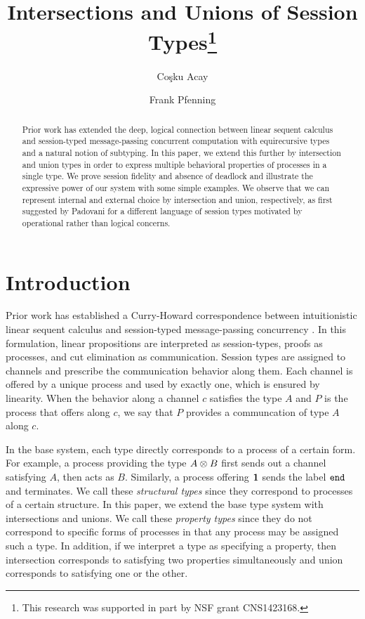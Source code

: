 \documentclass[a4paper,USenglish]{lipics-v2016}
\title{Intersections and Unions of Session Types\footnote{This research was supported in part by NSF grant CNS1423168.}}
\author[1]{Co\c{s}ku Acay}
\author[2]{Frank Pfenning}
\affil[1]{Carnegie Mellon University, Pittsburgh, PA 15213 \\
  \texttt{cacay@cmu.edu}}
\affil[2]{Carnegie Mellon University, Pittsburgh, PA 15213 \\
  \texttt{fp@cs.cmu.edu}}
\begin{document}
\maketitle

\begin{abstract}
  Prior work has extended the deep, logical connection between linear
  sequent calculus and session-typed message-passing concurrent
  computation with equirecursive types and a natural notion of
  subtyping. In this paper, we extend this further by intersection and
  union types in order to express multiple behavioral properties of
  processes in a single type. We prove session fidelity and absence of
  deadlock and illustrate the expressive power of our system with some
  simple examples. We observe that we can represent internal and
  external choice by intersection and union, respectively, as first
  suggested by Padovani for a different language of session types
  motivated by operational rather than logical concerns.
\end{abstract}


\section{Introduction}

Prior work has established a Curry-Howard correspondence between intuitionistic linear sequent calculus and session-typed message-passing concurrency \cite{CairesP10, PfenningG15, Honda93}. In this formulation, linear propositions are interpreted as session-types, proofs as processes, and cut elimination as communication. Session types are assigned to channels and prescribe the communication behavior along them. Each channel is offered by a unique process and used by exactly one, which is ensured by linearity. When the behavior along a channel $c$ satisfies the type $A$ and $P$ is the process that offers along $c$, we say that $P$ provides a communcation of type $A$ along $c$.

In the base system, each type directly corresponds to a process of a certain form. For example, a process providing the type $A \otimes B$ first sends out a channel satisfying $A$, then acts as $B$. Similarly, a process offering $\mathbf{1}$ sends the label $\texttt{end}$ and terminates. We call these \emph{structural types} since they correspond to processes of a certain structure. In this paper, we extend the base type system with intersections and unions. We call these \emph{property types} since they do not correspond to specific forms of processes in that any process may be assigned such a type. In addition, if we interpret a type as specifying a property, then intersection corresponds to satisfying two properties simultaneously and union corresponds to satisfying one or the other.
\end{document}
